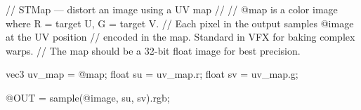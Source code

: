 // STMap — distort an image using a UV map
//
// @map is a color image where R = target U, G = target V.
// Each pixel in the output samples @image at the UV position
// encoded in the map. Standard in VFX for baking complex warps.
// The map should be a 32-bit float image for best precision.

vec3 uv_map = @map;
float su = uv_map.r;
float sv = uv_map.g;

@OUT = sample(@image, su, sv).rgb;
